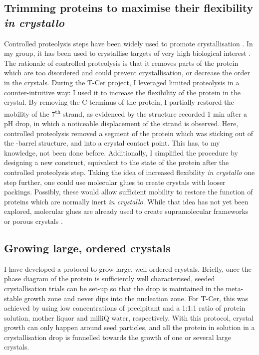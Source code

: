 \subsection{Trimming proteins to maximise their flexibility \textit{in crystallo}}
Controlled proteolysis steps have been widely used to promote crystallisation \parencite{dongSituProteolysisProtein2007,wernimontSituProteolysisGenerate2009,huangSeedingProteaseOptimize2012}. In my group, it has been used to crystallise targets of very high biological interest \parencite{gadellaMScarlet3BrilliantFastmaturing2023}. The rationale of controlled proteolysis is that it removes parts of the protein which are too disordered and could prevent crystallisation, or decrease the order in the crystals. 
\vspace{2mm}
During the T-Cer project, I leveraged limited proteolysis in a counter-intuitive way: I used it to increase the flexibility of the protein in the crystal. By removing the C-terminus of the protein, I partially restored the mobility of the 7\textsuperscript{th} strand, as evidenced by the structure recorded 1 min after a pH drop, in which a noticeable displacement of the strand is observed.  Here, controlled proteolysis removed a segment of the protein which was sticking out of the \textbeta-barrel structure, and into a crystal contact point. This has, to my knowledge, not been done before. Additionally, I simplified the procedure by designing a new construct, equivalent to the state of the protein after the controlled proteolysis step. 
\vspace{2mm}
Taking the idea of increased flexibility \textit{in crystallo} one step further, one could use molecular glues \parencite{engilbergeCrystallophoreVersatileLanthanide2017, alexCalixarenemediatedAssemblySmall2019} to create crystals with looser packings. Possibly, these would allow sufficient mobility to restore the function of proteins which are normally inert \textit{in crystallo}. While that idea has not yet been explored, molecular glues are already used to create supramolecular frameworks \parencite{engilbergeTuningProteinFrameworks2019} or porous crystals \parencite{jonesPorousProteinCrystals2024}.

\subsection{Growing large, ordered crystals}

I have developed a protocol to grow large, well-ordered crystals. Briefly, once the phase diagram of the protein is sufficiently well characterised, seeded crystallisation trials can be set-up so that the drop is maintained in the meta-stable growth zone and never dips into the nucleation zone. For T-Cer, this was achieved by using low concentrations of precipitant and a 1:1:1 ratio of protein solution, mother liquor and milliQ water, respectively. With this protocol, crystal growth can only happen around seed particles, and all the protein in solution in a crystallisation drop is funnelled towards the growth of one or several large crystals. 

